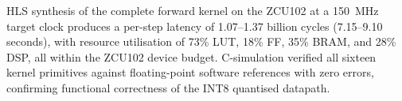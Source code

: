 HLS synthesis of the complete forward kernel on the ZCU102 at a
\SI{150}{\mega\hertz} target clock produces a per-step latency of
1.07--1.37 billion cycles (7.15--9.10 seconds), with resource utilisation of
73\% LUT, 18\% FF, 35\% BRAM, and 28\% DSP, all within the ZCU102 device
budget. C-simulation verified all sixteen kernel primitives against
floating-point software references with zero errors, confirming functional
correctness of the INT8 quantised datapath.

